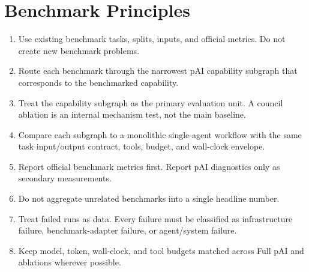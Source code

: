 \documentclass[11pt]{article}
\newcommand{\pai}{pAI}
\begin{document}
\section*{Benchmark Principles}

\begin{enumerate}
  \item Use existing benchmark tasks, splits, inputs, and official metrics. Do not create new benchmark problems.
  \item Route each benchmark through the narrowest \pai{} capability subgraph that corresponds to the benchmarked capability.
  \item Treat the capability subgraph as the primary evaluation unit. A council ablation is an internal mechanism test, not the main baseline.
  \item Compare each subgraph to a monolithic single-agent workflow with the same task input/output contract, tools, budget, and wall-clock envelope.
  \item Report official benchmark metrics first. Report \pai{} diagnostics only as secondary measurements.
  \item Do not aggregate unrelated benchmarks into a single headline number.
  \item Treat failed runs as data. Every failure must be classified as infrastructure failure, benchmark-adapter failure, or agent/system failure.
  \item Keep model, token, wall-clock, and tool budgets matched across Full \pai{} and ablations wherever possible.
\end{enumerate}
\end{document}
